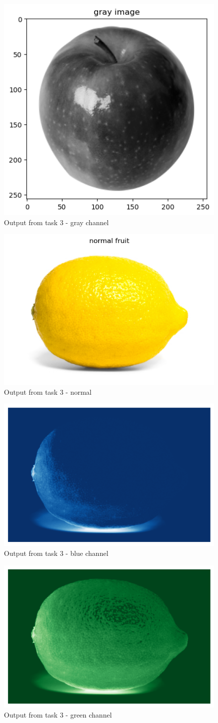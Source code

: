 \documentclass[conference]{IEEEtran} %
\begin{document}
\begin{figure}[H]
    \centering
    \includegraphics[width=0.5\linewidth]{Task3Output/gray2.png}
    \caption{Output from task 3 - gray channel}
    \label{fig:gray2}
\end{figure}

\begin{figure}[H]
    \centering
    \includegraphics[width=0.5\linewidth]{Task3Output/normalfruit3.png}
    \caption{Output from task 3 - normal}
    \label{fig:normal3}
\end{figure}

\begin{figure}[H]
    \centering
    \includegraphics[width=0.5\linewidth]{Task3Output/blue3.png}
    \caption{Output from task 3 - blue channel}
    \label{fig:blue3}
\end{figure}

\begin{figure}[H]
    \centering
    \includegraphics[width=0.5\linewidth]{Task3Output/green3.png}
    \caption{Output from task 3 - green channel}
    \label{fig:green3}
\end{figure}
\end{document}
